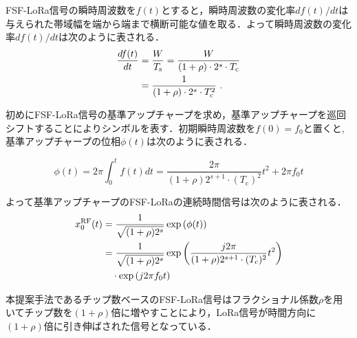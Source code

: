 \documentclass[technicalreport]{ieicej}
\begin{document}
FSF-LoRa信号の瞬時周波数を$f(t)$とすると，瞬時周波数の変化率$df(t)/dt$は与えられた帯域幅を端から端まで横断可能な値を取る．よって瞬時周波数の変化率$df(t)/dt$は次のように表される．
\begin{align}
\frac{df(t)}{dt}&=\frac{W}{ T_\mathrm{s}}=\frac{W}{ (1+\rho)\cdot2^s\cdot T_\mathrm{c}}\notag\\
&=\frac{1}{ (1+\rho)\cdot2^s\cdot T_\mathrm{c}^2}\ .
\end{align}

初めにFSF-LoRa信号の基準アップチャープを求め，基準アップチャープを巡回シフトすることによりシンボルを表す．初期瞬時周波数を$f(0)=f_0$と置くと,基準アップチャープの位相$\phi(t)$は次のように表される．

\begin{equation}
    \phi(t)=2\pi\int_0^t f(t)dt=\frac{2\pi}{(1+\rho)2^{s+1}\cdot (T_\mathrm{c})^2}t^2+2\pi f_0t
\end{equation}

よって基準アップチャープのFSF-LoRaの連続時間信号は次のように表される．
\begin{align}
    x_0^{\mathrm{RF}}(t)&=\frac{1}{\sqrt{(1+\rho)2^s}}\exp\left(\phi(t)\right)\notag\\
    &=\frac{1}{\sqrt{(1+\rho)2^s}}\exp\left(\frac{j2\pi}{(1+\rho)2^{s+1}\cdot (T_\mathrm{c})^2}t^2\right)\notag\\ 
    &\quad \cdot \exp\left(j2\pi f_0t\right)
\end{align}



本提案手法であるチップ数ベースのFSF-LoRa信号はフラクショナル係数$\rho$を用いてチップ数を$(1+\rho)$倍に増やすことにより，LoRa信号が時間方向に$(1+\rho)$倍に引き伸ばされた信号となっている．
\end{document}
